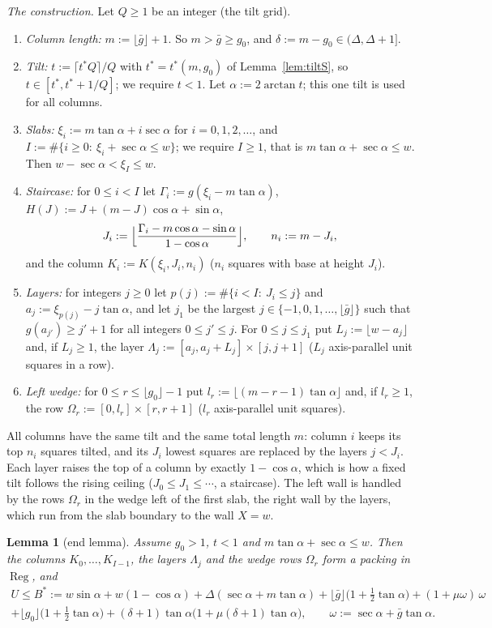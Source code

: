 \documentclass[11pt]{amsart}
\newcommand{\Reg}{\operatorname{Reg}}
\newcommand{\ca}{\cos\alpha}
\newcommand{\sa}{\sin\alpha}
\newcommand{\ta}{\tan\alpha}
\newcommand{\se}{\sec\alpha}
\newtheorem{lemma}[theorem]{Lemma}
\theoremstyle{definition}
\theoremstyle{remark}
\numberwithin{equation}{section}
\begin{document}
\emph{The construction.} Let $Q\ge1$ be an integer (the tilt grid).
\begin{enumerate}[label=(S\arabic*)]
\item \emph{Column length:} $m:=\lfloor\bar g\rfloor+1$. So $m>\bar g\ge g_0$, and $\delta:=m-g_0\in(\Delta,\Delta+1]$.
\item \emph{Tilt:} $t:=\lceil t^*Q\rceil/Q$ with $t^*=t^*(m,g_0)$ of Lemma~\ref{lem:tiltS}, so $t\in[t^*,t^*+1/Q]$;
we require $t<1$. Let $\alpha:=2\arctan t$; this one tilt is used for all columns.
\item \emph{Slabs:} $\xi_i:=m\ta+i\se$ for $i=0,1,2,\dots$, and $I:=\#\{i\ge0:\ \xi_i+\se\le w\}$; we require $I\ge1$,
that is $m\ta+\se\le w$. Then $w-\se<\xi_I\le w$.
\item \emph{Staircase:} for $0\le i<I$ let $\Gamma_i:=g(\xi_i-m\ta)$, $H(J):=J+(m-J)\ca+\sa$,
\[
J_i:=\Bigl\lfloor\frac{\Gamma_i-m\ca-\sa}{1-\ca}\Bigr\rfloor,\qquad n_i:=m-J_i,
\]
and the column $K_i:=K(\xi_i,J_i,n_i)$ ($n_i$ squares with base at height $J_i$).
\item \emph{Layers:} for integers $j\ge0$ let $p(j):=\#\{i<I:\ J_i\le j\}$ and $a_j:=\xi_{p(j)}-j\ta$, and let $j_1$ be
the largest $j\in\{-1,0,1,\dots,\lfloor\bar g\rfloor\}$ such that $g(a_{j'})\ge j'+1$ for all integers $0\le j'\le j$.
For $0\le j\le j_1$ put $L_j:=\lfloor w-a_j\rfloor$ and, if $L_j\ge1$, the layer
$\Lambda_j:=[a_j,a_j+L_j]\times[j,j+1]$ ($L_j$ axis-parallel unit squares in a row).
\item \emph{Left wedge:} for $0\le r\le\lfloor g_0\rfloor-1$ put $l_r:=\lfloor(m-r-1)\ta\rfloor$ and, if $l_r\ge1$, the
row $\Omega_r:=[0,l_r]\times[r,r+1]$ ($l_r$ axis-parallel unit squares).
\end{enumerate}
All columns have the same tilt and the same total length $m$: column $i$ keeps its top $n_i$ squares tilted, and its
$J_i$ lowest squares are replaced by the layers $j<J_i$. Each layer raises the top of a column by exactly $1-\ca$,
which is how a fixed tilt follows the rising ceiling ($J_0\le J_1\le\cdots$, a staircase). The left wall is handled by
the rows $\Omega_r$ in the wedge left of the first slab, the right wall by the layers, which run from the slab
boundary to the wall $X=w$.

\begin{lemma}[end lemma]\label{lem:stair}
Assume $g_0>1$, $t<1$ and $m\ta+\se\le w$. Then the columns $K_0,\dots,K_{I-1}$, the layers $\Lambda_j$ and the
wedge rows $\Omega_r$ form a packing in $\Reg$, and
\begin{multline*}
U\le B^*:=w\sa+w(1-\ca)+\Delta(\se+m\ta)+\lfloor\bar g\rfloor\bigl(1+\tfrac12\ta\bigr)+(1+\mu\omega)\,\omega\\
+\lfloor g_0\rfloor\bigl(1+\tfrac12\ta\bigr)+(\delta+1)\ta\bigl(1+\mu(\delta+1)\ta\bigr),\qquad
\omega:=\se+\bar g\ta .
\end{multline*}
\end{lemma}
\end{document}
